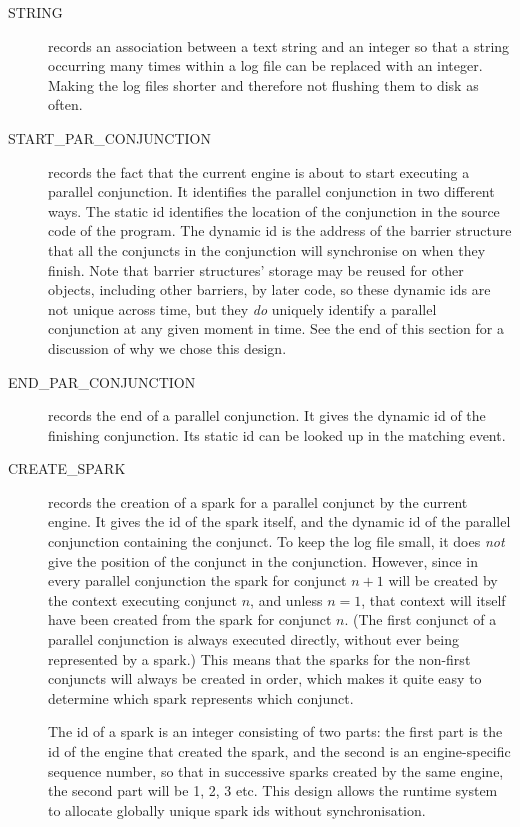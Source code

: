 \begin{description}

\item[STRING] records an association between a text string and an integer so
that a string occurring many times within a log file can be
replaced with an integer.
Making the log files shorter and therefore not flushing them to disk
as often.

\item[START\_PAR\_CONJUNCTION] records the fact that
the current engine is about to start executing a parallel conjunction.
It identifies the parallel conjunction in two different ways.
The static id identifies
the location of the conjunction in the source code of the program.
The dynamic id is the address of the barrier structure
that all the conjuncts in the conjunction will synchronise on when they finish.
Note that barrier structures' storage may be reused for other objects,
including other barriers, by later code,
so these dynamic ids are not unique across time,
but they \emph{do} uniquely identify a parallel conjunction
at any given moment in time.
See the end of this section for a discussion of why we chose this design.

\item[END\_PAR\_CONJUNCTION]
records the end of a parallel conjunction.
It gives the dynamic id of the finishing conjunction.
Its static id can be looked up in the matching
event.

\item[CREATE\_SPARK] records the creation of a spark
for a parallel conjunct by the current engine.
It gives the id of the spark itself,
and the dynamic id of the parallel conjunction containing the conjunct.
To keep the log file small,
it does \emph{not} give the position of the conjunct in the conjunction.
However, since in every parallel conjunction
the spark for conjunct $n+1$
will be created by the context executing conjunct $n$,
and unless $n=1$, that context will itself have been created
from the spark for conjunct $n$.
(The first conjunct of a parallel conjunction is always executed directly,
without ever being represented by a spark.)
This means that the sparks for the non-first conjuncts
will always be created in order,
which makes it quite easy to determine which spark represents which conjunct.

The id of a spark is an integer consisting of two parts:
the first part is the id of the engine that created the spark,
and the second is an engine-specific sequence number,
so that in successive sparks created by the same engine,
the second part will be 1, 2, 3 etc.
This design allows the runtime system
to allocate globally unique spark ids without synchronisation.


\end{description}
